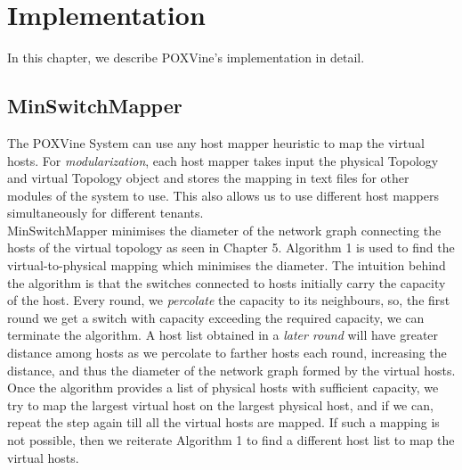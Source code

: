 \chapter{Implementation}
In this chapter, we describe POXVine's implementation in detail. 

\section{MinSwitchMapper}
The POXVine System can use any host mapper heuristic to map the virtual hosts. For \emph{modularization}, each host mapper takes input the physical Topology and virtual Topology object and stores the mapping in text files for other modules of the system to use. This also allows us to use different host mappers simultaneously for different tenants. \\

MinSwitchMapper minimises the diameter of the network graph connecting the hosts of the virtual topology as seen in Chapter 5. Algorithm 1 is used to find the virtual-to-physical mapping which minimises the diameter. The intuition behind the algorithm is that the switches connected to hosts initially carry the capacity of the host. Every round, we \emph{percolate} the capacity to its neighbours, so, the first round we get a switch with capacity exceeding the required capacity, we can terminate the algorithm. A host list obtained in a \emph{later round} will have greater distance among hosts as we percolate to farther hosts each round, increasing the distance, and thus the diameter of the network graph formed by the virtual hosts. \\

Once the algorithm provides a list of physical hosts with sufficient capacity, we try to map the largest virtual host on the largest physical host, and if we can, repeat the step again till all the virtual hosts are mapped. If such a mapping is not possible, then we reiterate Algorithm 1 to find a different host list to map the virtual hosts. 


